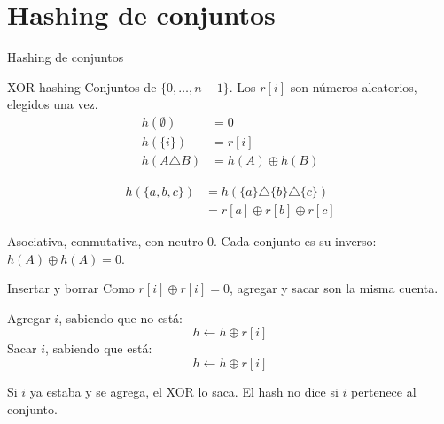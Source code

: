 \section{Hashing de conjuntos}

\begin{frame}
  \vspace{1.5cm}
  \centering
  {\LARGE Hashing de conjuntos}
\end{frame}

\begin{frame}{XOR hashing}
  Conjuntos de \(\{0,\ldots,n-1\}\).
  Los \(r[i]\) son números aleatorios, elegidos una vez.
  \[
    \begin{aligned}
      h(\emptyset) &= 0 \\
      h(\{i\}) &= r[i] \\
      h(A \triangle B) &= h(A) \oplus h(B)
    \end{aligned}
  \]

  \vspace{-0.4em}
  \[
    \begin{aligned}
      h(\{a,b,c\})
        &= h(\{a\} \triangle \{b\} \triangle \{c\}) \\
        &= r[a] \oplus r[b] \oplus r[c]
    \end{aligned}
  \]

  Asociativa, conmutativa, con neutro \(0\).
  Cada conjunto es su inverso: \(h(A) \oplus h(A) = 0\).
\end{frame}

\begin{frame}{Insertar y borrar}
  Como \(r[i] \oplus r[i] = 0\), agregar y sacar son la misma cuenta.

  \medskip
  Agregar \(i\), sabiendo que no está:
  \[
    h \leftarrow h \oplus r[i]
  \]
  Sacar \(i\), sabiendo que está:
  \[
    h \leftarrow h \oplus r[i]
  \]

  \medskip
  Si \(i\) ya estaba y se agrega, el XOR lo saca.
  El hash no dice si \(i\) pertenece al conjunto.
\end{frame}
